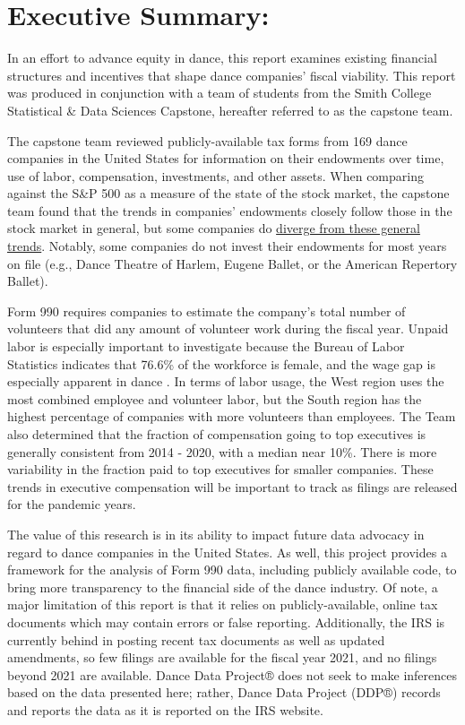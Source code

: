 \documentclass[Dance Data
Project,article,submit,moreauthors,pdftex]{mdpi}
\begin{document}

\hypertarget{executive-summary}{%
\section{Executive Summary:}\label{executive-summary}}

In an effort to advance equity in dance, this report examines existing
financial structures and incentives that shape dance companies' fiscal
viability. This report was produced in conjunction with a team of
students from the Smith College Statistical \& Data Sciences Capstone,
hereafter referred to as the capstone team.

The capstone team reviewed publicly-available tax forms from 169 dance
companies in the United States for information on their endowments over
time, use of labor, compensation, investments, and other assets. When
comparing against the S\&P 500 as a measure of the state of the stock
market, the capstone team found that the trends in companies' endowments
closely follow those in the stock market in general, but some companies
do
\hyperref[fig:annual-growth-endowment]{diverge from these general trends}.
Notably, some companies do not invest their endowments for most years on
file (e.g., Dance Theatre of Harlem, Eugene Ballet, or the American
Repertory Ballet).

Form 990 requires companies to estimate the company's total number of
volunteers that did any amount of volunteer work during the fiscal year.
Unpaid labor is especially important to investigate because the Bureau
of Labor Statistics indicates that 76.6\% of the workforce is female,
and the wage gap is especially apparent in dance
\citep{jikar_gender_2022}. In terms of labor usage, the West region uses
the most combined employee and volunteer labor, but the South region has
the highest percentage of companies with more volunteers than employees.
The Team also determined that the fraction of compensation going to top
executives is generally consistent from 2014 - 2020, with a median near
10\%. There is more variability in the fraction paid to top executives
for smaller companies. These trends in executive compensation will be
important to track as filings are released for the pandemic years.

The value of this research is in its ability to impact future data
advocacy in regard to dance companies in the United States. As well,
this project provides a framework for the analysis of Form 990 data,
including publicly available code, to bring more transparency to the
financial side of the dance industry. Of note, a major limitation of
this report is that it relies on publicly-available, online tax
documents which may contain errors or false reporting. Additionally, the
IRS is currently behind in posting recent tax documents as well as
updated amendments, so few filings are available for the fiscal year
2021, and no filings beyond 2021 are available. Dance Data Project® does
not seek to make inferences based on the data presented here; rather,
Dance Data Project (DDP®) records and reports the data as it is reported
on the IRS website.
\end{document}
